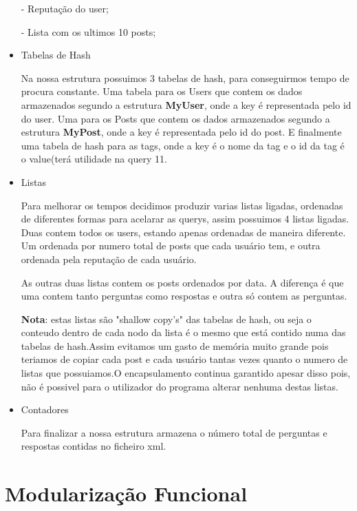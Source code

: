 \documentclass[a4paper,10pt]{article}
\begin{document}
\begin{itemize}
    \quad \quad - Reputa\c{c}\~{a}o do user;

    \quad \quad - Lista com os ultimos 10 posts;

    \item Tabelas de Hash

    \quad Na nossa estrutura possuimos 3 tabelas de hash, para conseguirmos tempo de procura constante. Uma tabela para os Users que contem os dados armazenados segundo a estrutura \textbf{MyUser}, onde a key \'e representada pelo id do user. Uma para os Posts que contem os dados armazenados segundo a estrutura \textbf{MyPost}, onde a key \'e representada pelo id do post. E finalmente uma tabela de hash para as tags, onde a key \'e o nome da tag e o id da tag \'e o value(ter\'a utilidade na query 11.

    \item Listas

    \quad Para melhorar os tempos decidimos produzir varias listas ligadas, ordenadas de diferentes formas para acelarar as querys, assim possuimos 4 listas ligadas. Duas contem todos os users, estando apenas ordenadas de maneira diferente. Um ordenada por numero total de posts que cada usu\'{a}rio tem, e outra ordenada pela reputa\c{c}\~{a}o de cada usu\'{a}rio.

    \quad As outras duas listas contem os posts ordenados por data. A diferen\c{c}a \'e que uma contem tanto perguntas como respostas e outra s\'{o} contem as perguntas.

    \quad \textbf{Nota}: estas listas s\~{a}o "shallow copy's" das tabelas de hash, ou seja o conteudo dentro de cada nodo da lista \'e o mesmo que est\'{a} contido numa das tabelas de hash.Assim evitamos um gasto de mem\'{o}ria muito grande pois teriamos de copiar cada post e cada usu\'{a}rio tantas vezes quanto o numero de listas que possuiamos.O encapsulamento continua garantido apesar disso pois, n\~{a}o \'e possivel para o utilizador do programa alterar nenhuma destas listas.

    \item Contadores

    \quad Para finalizar a nossa estrutura armazena o n\'{u}mero total de perguntas e respostas contidas no ficheiro xml.

    \end{itemize}
    

    \section {Modulariza\c{c}\~{a}o Funcional}
\end{document}
